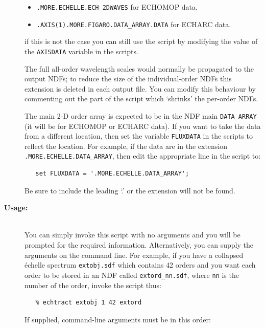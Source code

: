 \documentclass[twoside,11pt]{article}
\begin{document}
\begin{description}
\begin{itemize}
\item \verb+.MORE.ECHELLE.ECH_2DWAVES+ for ECHOMOP data.

\item \verb+.AXIS(1).MORE.FIGARO.DATA_ARRAY.DATA+ for ECHARC data.

\end{itemize}

     if this is not the case you can still use the script by modifying
     the value of the \verb+AXISDATA+ variable in the scripts.

     The full all-order wavelength scales
     would normally be propagated to the output NDFs; to reduce the
     size of the individual-order NDFs this extension is deleted in each
     output file.  You can modify this behaviour by commenting out the
     part of the script which `shrinks' the per-order NDFs.

     The main 2-D order array is expected to be in the NDF main
     \verb+DATA_ARRAY+ (it will be for ECHOMOP or ECHARC data).
     If you want to take the data from a different location, then
     set the variable \verb+FLUXDATA+ in the scripts to reflect
     the location.  For example, if the data are in the extension
     \verb+.MORE.ECHELLE.DATA_ARRAY+, then edit the appropriate line
     in the script to:

\begin{verbatim}
   set FLUXDATA = '.MORE.ECHELLE.DATA_ARRAY';
\end{verbatim}

     Be sure to include the leading `.' or the extension will not be
     found.

\item [{\bf Usage:}] \mbox{} \\
     You can simply invoke this script with no arguments and you
     will be prompted for the required information.  Alternatively,
     you can supply the arguments on the command line.  For example,
     if you have a collapsed \'{e}chelle spectrum \verb+extobj.sdf+ which
     contains 42 orders and you want each order to be stored in an NDF
     called {\tt extord\_nn.sdf}, where \verb+nn+ is the number of the
     order, invoke the script thus:

\begin{verbatim}
   % echtract extobj 1 42 extord
\end{verbatim}

     If supplied, command-line arguments must be in this order:

\begin{enumerate}


\end{enumerate}
\end{description}
\end{document}

